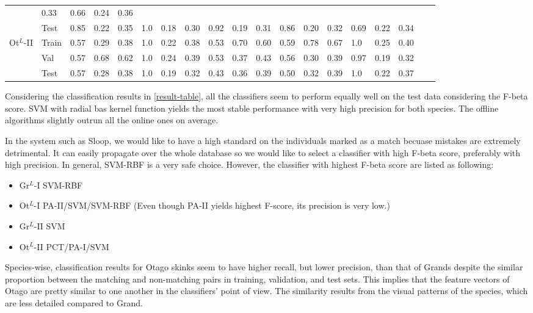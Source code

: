 {\begin{landscape}
\begin{table}
\begin{tabular}{lllll|lll|lll|lll|lllll}
                                       & 0.33 & 0.66 & 0.24 & 0.36     \\
                                       & Test  & 0.85 & 0.22 & 0.35 & 1.0 & 0.18
                                       & 0.30 & 0.92 & 0.19 & 0.31 & 0.86 & 0.20
                                       & 0.32 & 0.69 & 0.22 & 0.34     \\
          \hline
          \multirow{3}{*}{Ot$^{L}$-II} & Train & 0.57 & 0.29 & 0.38 & 1.0 & 0.22
          & 0.38 & 0.53 & 0.70 & 0.60 & 0.59 & 0.78 & 0.67 & 1.0 & 0.25
          & 0.40     \\
                                       & Val  & 0.57 & 0.68 & 0.62 & 1.0 & 0.24
                                       & 0.39 & 0.53 & 0.37 & 0.43 & 0.56 & 0.30
                                       & 0.39 & 0.97 & 0.19 & 0.32   \\
                                       & Test  & 0.57 & 0.28 & 0.38  & 1.0
                                       & 0.19 & 0.32 & 0.43 & 0.36 & 0.39 & 0.50
                                       & 0.32 & 0.39 & 1.0 & 0.22 & 0.37     \\
          \bottomrule
        \end{tabular}
      \end{table}
    \end{landscape}
    \clearpage%
}

Considering the classification results in \ref{result-table}, all the
classifiers seem to perform equally well on the test data considering the
F-beta score. SVM with radial bas kernel function yields the most stable
performance with very high precision for both species. The offline algorithms
slightly outrun all the online ones on average.

In the system such as Sloop, we would like to have a high standard on the
individuals marked as a match becuase mistakes are extremely detrimental. It
can easily propagate over the whole database so we would like to select a
classifier with high F-beta score, preferably with high precision. In general,
SVM-RBF is a very safe choice. However, the classifier with highest F-beta
score are listed as following:

\begin{itemize}
  \item Gr$^{L}$-I SVM-RBF
  \item Ot$^{L}$-I PA-II/SVM/SVM-RBF (Even though PA-II yields highest F-score,
  its precision is very low.)
  \item Gr$^{L}$-II SVM
  \item Ot$^{L}$-II PCT/PA-I/SVM
\end{itemize}

Species-wise, classification results for Otago skinks seem to have higher
recall, but lower precision, than that of Grands despite the similar proportion
between the matching and non-matching pairs in training, validation, and test
sets. This implies that the feature vectors of Otago are pretty similar to one
another in the classifiers' point of view. The similarity results from the
visual patterns of the species, which are less detailed compared to Grand.
